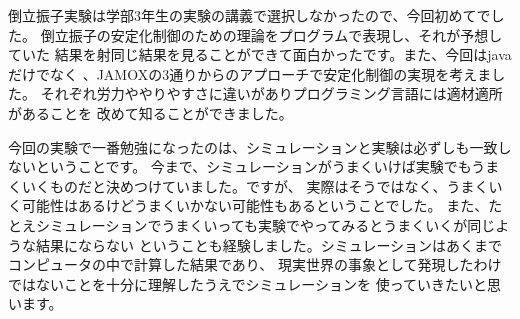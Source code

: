   倒立振子実験は学部3年生の実験の講義で選択しなかったので、今回初めてでした。
  倒立振子の安定化制御のための理論をプログラムで表現し、それが予想していた
  結果を射同じ結果を見ることができて面白かったです。また、今回はjavaだけでなく
  \MaTX{}、JAMOXの3通りからのアプローチで安定化制御の実現を考えました。
  それぞれ労力ややりやすさに違いがありプログラミング言語には適材適所があることを
  改めて知ることができました。
  \par
  今回の実験で一番勉強になったのは、シミュレーションと実験は必ずしも一致しないということです。
  今まで、シミュレーションがうまくいけば実験でもうまくいくものだと決めつけていました。ですが、
  実際はそうではなく、うまくいく可能性はあるけどうまくいかない可能性もあるということでした。
  また、たとえシミュレーションでうまくいっても実験でやってみるとうまくいくが同じような結果にならない
  ということも経験しました。シミュレーションはあくまでコンピュータの中で計算した結果であり、
  現実世界の事象として発現したわけではないことを十分に理解したうえでシミュレーションを
  使っていきたいと思います。
  
  
